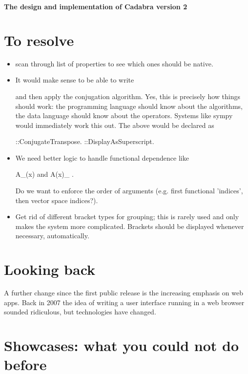 \documentclass[11pt]{article}
\begin{document}
{\bf The design and implementation of Cadabra version 2}

\section{To resolve}

\begin{itemize}
\item scan through list of properties to see which ones should be
native.

\item It would make sense to be able to write


and then apply the conjugation algorithm. Yes, this is precisely how
things should work: the programming language should know about the
algorithms, the data language should know about the operators. Systems
like sympy would immediately work this out. The above would be
declared as

  \dagger{#}::ConjugateTranspose.
  \dagger{#}::DisplayAsSuperscript.

\item We need better logic to handle functional dependence like

   A_\mu(x)  and  A(x)_{\mu} .

Do we want to enforce the order of arguments (e.g. first functional
'indices', then vector space indices?).  

\item Get rid of different bracket types for grouping; this is rarely used and only
makes the system more complicated. Brackets should be displayed
whenever necessary, automatically. 
\end{itemize}



\section{Looking back}


A further change since the first public release is the increasing
emphasis on web apps. Back in 2007 the idea of writing a user
interface running in a web browser sounded ridiculous, but
technologies have changed. 

\section{Showcases: what you could not do before}
\end{document}
